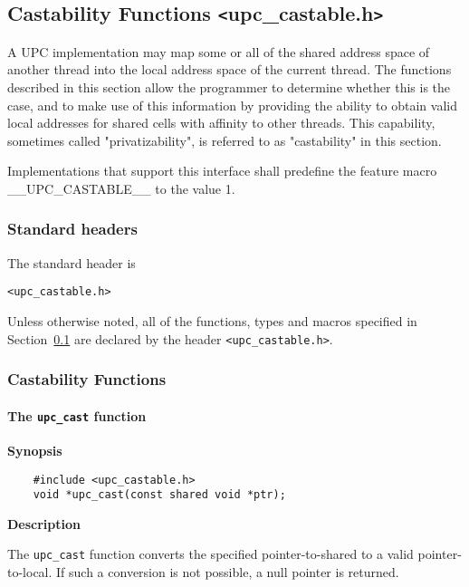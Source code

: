 \subsection{Castability Functions \texttt{<}upc\_castable.h\texttt{>}}
\label{upc-castable}

\npf A UPC implementation may map some or all of the shared address space
of another thread into the local address space of the current thread.  The
functions described in this section allow the programmer to determine
whether this is the case, and to make use of this information by
providing the ability to obtain valid local addresses for shared cells
with affinity to other threads.  This capability, sometimes called
"privatizability", is referred to as "castability" in this section.

\np Implementations that support this interface shall predefine the
feature macro {\_\_UPC\_CASTABLE\_\_} to the value 1.

\subsubsection{Standard headers}

\npf The standard header is

{\tt <upc\_castable.h>}

\np Unless otherwise noted, all of the functions, types and macros
specified in Section~\ref{upc-castable}
are declared by the header {\tt <upc\_castable.h>}.

\subsubsection{Castability Functions}

\paragraph{The {\tt upc\_cast} function}

{\bf Synopsis}

\npf\vspace{-2.5em}
\begin{verbatim}
    #include <upc_castable.h>
    void *upc_cast(const shared void *ptr);
\end{verbatim}

{\bf Description}

\np The {\tt upc\_cast} function converts the specified
pointer-to-shared to a valid pointer-to-local.  If such a conversion
is not possible, a null pointer is returned.

